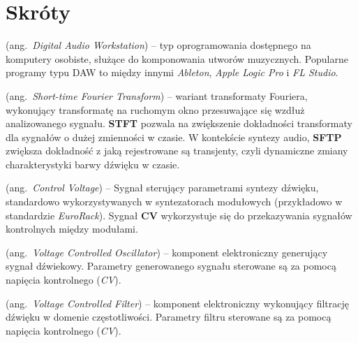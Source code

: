 % 
\chapter*{Skróty}\label{sec:skroty}
\noindent\vspace{-\topsep-\partopsep-\parsep} %
\begin{description}[labelwidth=*]
  \item [DAW] (ang.\ \emph{Digital Audio Workstation}) -- typ oprogramowania dostępnego na komputery osobiste, służące do komponowania utworów muzycznych. Popularne programy typu DAW to między innymi \textit{Ableton}, \textit{Apple Logic Pro} i \textit{FL Studio}.
  \item [STFT] (ang.\ \emph{Short-time Fourier Transform}) -- wariant transformaty Fouriera, wykonujący transformatę na ruchomym okno przesuwające się wzdłuż analizowanego sygnału. \textbf{STFT} pozwala na zwiększenie dokładności transformaty dla sygnałów o dużej zmienności w czasie. W kontekście syntezy audio, \textbf{SFTP} zwiększa dokładność z jaką rejestrowane są transjenty, czyli dynamiczne zmiany charakterystyki barwy dźwięku w czasie.
  \item [CV] (ang.\ \emph{Control Voltage}) -- Sygnał sterujący parametrami syntezy dźwięku, standardowo wykorzystywanych w syntezatorach modułowych (przykładowo w standardzie \textit{EuroRack}). Sygnał \textbf{CV} wykorzystuje się do przekazywania sygnałów kontrolnych między modułami.
  \item [VCO] (ang.\ \emph{Voltage Controlled Oscillator}) -- komponent elektroniczny generujący sygnał dźwiekowy. Parametry generowanego sygnału sterowane są za pomocą napięcia kontrolnego (\textit{CV}).
  \item [VCF] (ang.\ \emph{Voltage Controlled Filter}) -- komponent elektroniczny wykonujący filtrację dźwięku w domenie częstotliwości. Parametry filtru sterowane są za pomocą napięcia kontrolnego (\textit{CV}).
\end{description}
